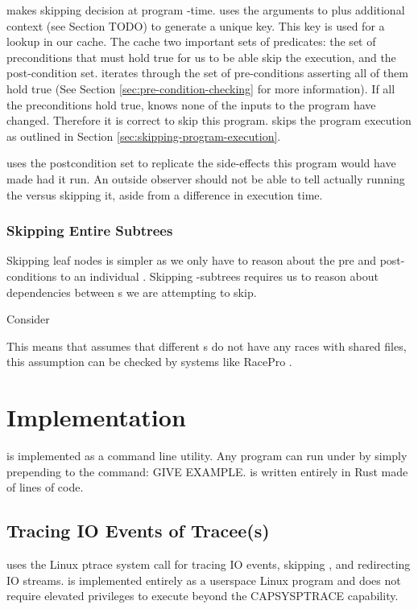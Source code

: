 \pc makes skipping decision at program -time. \pc uses the arguments to  plus additional context (see Section TODO) to generate a unique key. This key is used for a lookup in our cache. The cache two important sets of predicates: the set of preconditions that must hold true for us to be able skip the execution, and the post-condition set. \pc iterates through the set of pre-conditions asserting all of them hold true (See Section \ref{sec:pre-condition-checking} for more information). If all the preconditions hold true, \pc knows none of the inputs to the program have changed. Therefore it is correct to skip this program. \pc skips the program execution as outlined in Section \ref{sec:skipping-program-execution}.

\pc uses the postcondition set to replicate the side-effects this program would have made had it run. An outside observer should not be able to tell actually running the \cacheunit{} versus \pc skipping it, aside from a difference in execution time.

\subsubsection{Skipping Entire Subtrees}
Skipping leaf nodes is simpler as we only have to reason about the pre and post-conditions to an individual \cacheunit{}. Skipping \cacheunit{}-subtrees requires us to reason about dependencies between \cacheunit{}s we are attempting to skip.

Consider

This means that \pc assumes that different \cacheunit{}s do not have any races with shared files, this assumption can be checked by systems like RacePro \cite{racepro}.

\section{\pc Implementation}

\pc is implemented as a command line utility. Any program can run under \pc by simply prepending \pc to the command: GIVE EXAMPLE. \pc is written entirely in Rust made of \systemLOC lines of code.
\subsection{Tracing IO Events of Tracee(s)}
\pc uses the Linux ptrace system call for tracing IO events, skipping \cacheunit, and redirecting IO streams. \pc is implemented entirely as a userspace Linux program and does not require elevated privileges to execute beyond the CAP\textunderscore SYS\textunderscore PTRACE capability.

